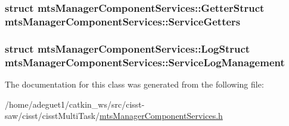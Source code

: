 \hypertarget{classmts_manager_component_services_aa2830971a51549f362b28011511b177f}{
\subsubsection[{Service\-Getters}]{\setlength{\rightskip}{0pt plus 5cm}struct {\bf mts\-Manager\-Component\-Services\-::\-Getter\-Struct}  mts\-Manager\-Component\-Services\-::\-Service\-Getters\hspace{0.3cm}{\ttfamily [protected]}}}\label{classmts_manager_component_services_aa2830971a51549f362b28011511b177f}
\hypertarget{classmts_manager_component_services_a521a825f8142d5b44abf696abab1f8ef}{
\subsubsection[{Service\-Log\-Management}]{\setlength{\rightskip}{0pt plus 5cm}struct {\bf mts\-Manager\-Component\-Services\-::\-Log\-Struct}  mts\-Manager\-Component\-Services\-::\-Service\-Log\-Management\hspace{0.3cm}{\ttfamily [protected]}}}\label{classmts_manager_component_services_a521a825f8142d5b44abf696abab1f8ef}


The documentation for this class was generated from the following file\-:\begin{DoxyCompactItemize}
\item 
/home/adeguet1/catkin\-\_\-ws/src/cisst-\/saw/cisst/cisst\-Multi\-Task/\hyperlink{mts_manager_component_services_8h}{mts\-Manager\-Component\-Services.\-h}\end{DoxyCompactItemize}
